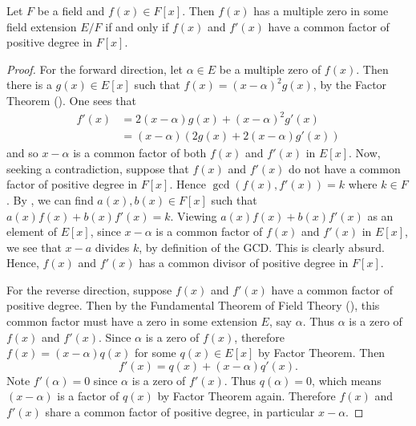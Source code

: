 \begin{theorem}\label{thrm-criterion-for-multiple-zeroes}
    Let $F$ be a field and $f(x) \in F[x]$. Then $f(x)$ has a multiple zero in some field extension $E/F$ if and only if $f(x)$ and $f'(x)$ have a common factor of positive degree in $F[x]$.
\end{theorem}
\begin{proof}
    For the forward direction, let $\alpha \in E$ be a multiple zero of $f(x)$. Then there is a $g(x) \in E[x]$ such that $f(x) = (x-\alpha)^2g(x)$, by the Factor Theorem (). One sees that
    \begin{align*}
        f'(x) &= 2(x-\alpha)g(x) + (x-\alpha)^2g'(x)\\
        &= (x-\alpha)\left(2g(x) + 2(x-\alpha)g'(x)\right)
    \end{align*}
    and so $x-\alpha$ is a common factor of both $f(x)$ and $f'(x)$ in $E[x]$. Now, seeking a contradiction, suppose that $f(x)$ and $f'(x)$ do not have a common factor of positive degree in $F[x]$. Hence $\gcd(f(x), f'(x)) = k$ where $k \in F$. By , we can find $a(x), b(x) \in F[x]$ such that $a(x)f(x) + b(x)f'(x) = k$. Viewing $a(x)f(x) + b(x)f'(x)$ as an element of $E[x]$, since $x-\alpha$ is a common factor of $f(x)$ and $f'(x)$ in $E[x]$, we see that $x-a$ divides $k$, by definition of the GCD. This is clearly absurd. Hence, $f(x)$ and $f'(x)$ has a common divisor of positive degree in $F[x]$.

    For the reverse direction, suppose $f(x)$ and $f'(x)$ have a common factor of positive degree. Then by the Fundamental Theorem of Field Theory (), this common factor must have a zero in some extension $E$, say $\alpha$. Thus $\alpha$ is a zero of $f(x)$ and $f'(x)$. Since $\alpha$ is a zero of $f(x)$, therefore $f(x) = (x-\alpha)q(x)$ for some $q(x) \in E[x]$ by Factor Theorem. Then
    \[
        f'(x) = q(x) + (x-\alpha)q'(x).
    \]
    Note $f'(\alpha) = 0$ since $\alpha$ is a zero of $f'(x)$. Thus $q(\alpha) = 0$, which means $(x-\alpha)$ is a factor of $q(x)$ by Factor Theorem again. Therefore $f(x)$ and $f'(x)$ share a common factor of positive degree, in particular $x-\alpha$.
\end{proof}

